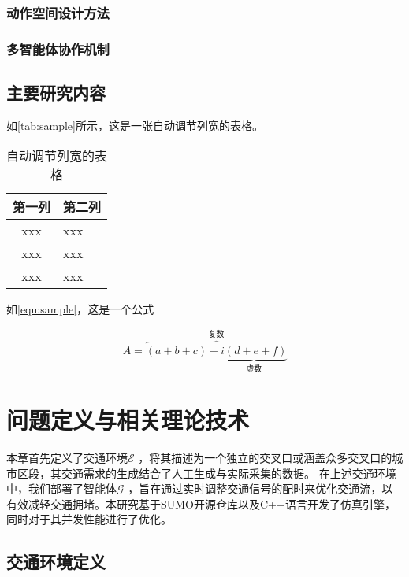 \subsection{动作空间设计方法}
\subsection{多智能体协作机制}

\section{主要研究内容}

\par 如\autoref{tab:sample}所示，这是一张自动调节列宽的表格。

\begin{table}[htbp]
    \caption{\label{tab:sample}自动调节列宽的表格}
    \begin{tabularx}{\linewidth}{c|X<{\centering}}
        \hline
        第一列 & 第二列 \\ \hline
        xxx & xxx \\ \hline
        xxx & xxx \\ \hline
        xxx & xxx \\ \hline
    \end{tabularx}
\end{table}


\par 如\autoref{equ:sample}，这是一个公式

\begin{equation}
    \label{equ:sample}
    A=\overbrace{(a+b+c)+\underbrace{i(d+e+f)}_{\text{虚数}}}^{\text{复数}}
\end{equation}




\chapter{问题定义与相关理论技术}
本章首先定义了交通环境$\mathcal{E}$ ，将其描述为一个独立的交叉口或涵盖众多交叉口的城市区段，其交通需求的生成结合了人工生成与实际采集的数据。
在上述交通环境中，我们部署了智能体$\mathcal{G}$ ，旨在通过实时调整交通信号的配时来优化交通流，以有效减轻交通拥堵。本研究基于SUMO开源仓库以及C++语言开发了仿真引擎，同时对于其并发性能进行了优化。
\section{交通环境定义}


